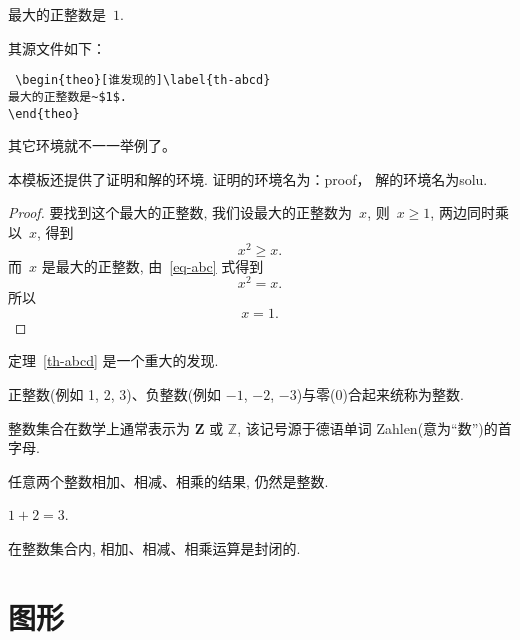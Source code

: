 \begin{theo}[谁发现的]\label{th-abcd}
    最大的正整数是~$1$.
\end{theo}

其源文件如下：

\begin{lstlisting}
 \begin{theo}[谁发现的]\label{th-abcd}
最大的正整数是~$1$.
\end{theo}
\end{lstlisting}

其它环境就不一一举例了。

本模板还提供了证明和解的环境. 证明的环境名为：proof， 解的环境名为solu.

\begin{proof}
    要找到这个最大的正整数, 我们设最大的正整数为~$x$, 则~$x \geqslant 1$, 两边同时乘以~$x$, 得到
    \begin{equation}\label{eq-abc}
        x^2 \geqslant x.
    \end{equation}
    而~$x$ 是最大的正整数, 由~\ref{eq-abc} 式得到
    \[
        x^2 = x.
    \]
    所以
    \begin{equation*}
        x = 1.
    \end{equation*}
\end{proof}

定理~\ref{th-abcd} 是一个重大的发现.

\begin{defi}[整数]
    正整数(例如 1, 2, 3)、负整数(例如 ${-1}$, $-2$, $-3$)与零(0)合起来统称为{\heiti 整数}.
\end{defi}

\begin{rema}
    整数集合在数学上通常表示为 $\mathbf{Z}$ 或 $\mathbb{Z}$, 该记号源于德语单词 Zahlen(意为``数'')的首字母.
\end{rema}

\begin{prop}
    任意两个整数相加、相减、相乘的结果, 仍然是整数.
\end{prop}

\begin{exam}
    $1+2=3$.
\end{exam}

\begin{coro}
    在整数集合内, 相加、相减、相乘运算是封闭的.
\end{coro}

\section{图形}

